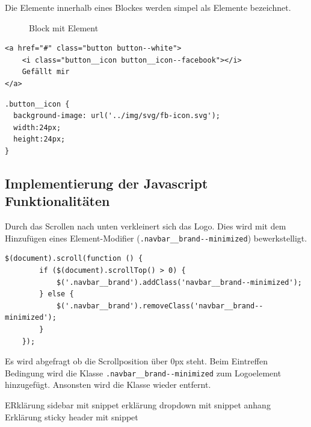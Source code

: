 Die Elemente innerhalb eines Blockes werden simpel als Elemente bezeichnet.

\begin{figure}[ht]
\caption{Block mit Element}
\end{figure}

\begin{lstlisting}[style=htmlcssjs, backgroundcolor = \color{lightgray},
caption=BEM -- Block mit Element (HTML)]
<a href="#" class="button button--white">
	<i class="button__icon button__icon--facebook"></i>
	Gefällt mir
</a>
\end{lstlisting}

\begin{lstlisting}[style=htmlcssjs, backgroundcolor = \color{lightgray},
caption=BEM -- Element (CSS)]
.button__icon {
  background-image: url('../img/svg/fb-icon.svg');
  width:24px;
  height:24px;
}
\end{lstlisting}


\subsection{Implementierung der Javascript Funktionalitäten}
\label{sec:ImplementierungJS}
Durch das Scrollen nach unten verkleinert sich das Logo. Dies wird mit dem
Hinzufügen eines Element-Modifier (\lstinline{.navbar__brand--minimized})
bewerkstelligt.
\begin{lstlisting}[style=htmlcssjs, backgroundcolor = \color{lightgray},
caption=Logominimierung beim Scrollen]
    $(document).scroll(function () {
        if ($(document).scrollTop() > 0) {
            $('.navbar__brand').addClass('navbar__brand--minimized');
        } else {
            $('.navbar__brand').removeClass('navbar__brand--minimized');
        }
    });
\end{lstlisting}
Es wird abgefragt ob die Scrollposition über 0px steht. Beim Eintreffen
Bedingung wird die Klasse \lstinline{.navbar__brand--minimized} zum
Logoelement hinzugefügt. Ansonsten wird die Klasse wieder entfernt. 


ERklärung sidebar mit snippet
erklärung dropdown mit snippet anhang
Erklärung sticky header mit snippet


